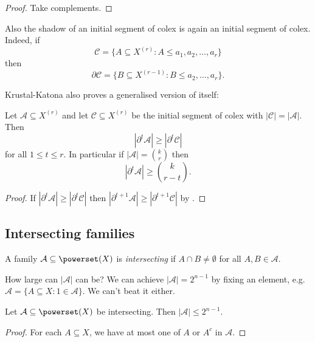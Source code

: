 \documentclass[a4paper]{article}
\newcommand{\shadow}{\partial}
\begin{document}
\begin{proof}
  Take complements.
\end{proof}

Also the shadow of an initial segment of colex is again an initial segment of colex. Indeed, if
\[
  \mathcal C = \{A \subseteq X^{(r)}: A \leq a_1,a_2,\dots,a_r\}
\]
then
\[
  \shadow \mathcal C = \{B \subseteq X^{(r - 1)}: B \leq a_2,\dots,a_r\}.
\]

Krustal-Katona also proves a generalised version of itself:

\begin{corollary}
  Let \(\mathcal A \subseteq X^{(r)}\) and let \(\mathcal C \subseteq X^{(r)}\) be the initial segment of colex with \(|\mathcal C| = |\mathcal A|\). Then
  \[
    |\shadow^t \mathcal A| \geq |\shadow^t \mathcal C|
  \]
  for all \(1 \leq t \leq r\). In particular if \(|\mathcal A| = \binom{k}{r}\) then
  \[
    |\shadow^t \mathcal A| \geq \binom{k}{r - t}.
  \]
\end{corollary}

\begin{proof}
  If \(|\shadow^t \mathcal A| \geq |\shadow^t \mathcal C|\) then \(|\shadow^{t + 1}\mathcal A| \geq |\shadow^{t + 1} \mathcal C|\) by .
\end{proof}

\subsection{Intersecting families}

\begin{definition}
  A family \(\mathcal A \subseteq \powerset(X)\) is \emph{intersecting} if \(A \cap B \neq \emptyset\) for all \(A, B \in \mathcal A\).
\end{definition}

How large can \(|\mathcal A|\) can be? We can achieve \(|\mathcal A| = 2^{n - 1}\) by fixing an element, e.g.\ \(\mathcal A = \{A \subseteq X: 1 \in \mathcal A\}\). We can't beat it either.

\begin{proposition}
  Let \(\mathcal A \subseteq \powerset(X)\) be intersecting. Then \(|\mathcal A| \leq 2^{n - 1}\).
\end{proposition}

\begin{proof}
  For each \(A \subseteq X\), we have at most one of \(A\) or \(A^c\) in \(\mathcal A\).
\end{proof}
\end{document}
